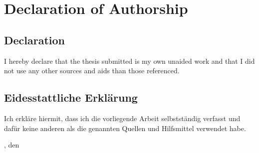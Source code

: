 \chapter{Declaration of Authorship} 

\section*{Declaration} 

I hereby declare that the thesis submitted is my own unaided work and that I did not use any other sources and aids than those referenced.

\bigskip\bigskip

\section*{Eidesstattliche Erklärung}

Ich erkläre hiermit, dass ich die vorliegende Arbeit selbstständig verfasst und dafür keine anderen als die genannten Quellen und Hilfsmittel verwendet habe.

\bigskip\bigskip\bigskip\bigskip



\begin{minipage}{6cm}
\docCity{}, den \docDate
\bigskip\bigskip\bigskip


\hrulefill

\small{\docAuthor}
\end{minipage}